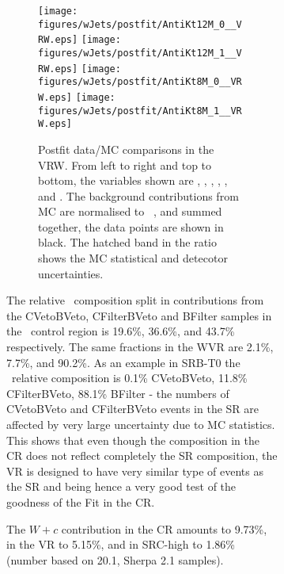 \begin{figure}[htbp]
\begin{center}
\begin{figure}[htbp]
\begin{center}
{{\begin{figure}[!htb]
  \centering
  \texttt{[image: figures/wJets/postfit/AntiKt12M\_0\_\_VRW.eps]}
  \texttt{[image: figures/wJets/postfit/AntiKt12M\_1\_\_VRW.eps]}
  \texttt{[image: figures/wJets/postfit/AntiKt8M\_0\_\_VRW.eps]}
  \texttt{[image: figures/wJets/postfit/AntiKt8M\_1\_\_VRW.eps]}
  \caption{Postfit data/MC comparisons in the VRW. From left to right and top to bottom, the variables shown are \met, \mtbmin, \mtbmax, \mantikttwelvezero, \mantikttwelveone, and \mantikteightzero. The background contributions from MC are normalised to \intlumi\ \ifb, and summed together, the data points are shown in black. The hatched band in the ratio shows the MC statistical and detecotor uncertainties.}
  \label{fig:VRWMasses}
\end{figure}


The relative \Wjets\ composition split in contributions from the CVetoBVeto, CFilterBVeto and BFilter samples in the \Wjets\ control region is 19.6\%, 36.6\%, and 43.7\% respectively. The same fractions in the WVR are 2.1\%, 7.7\%, and 90.2\%. As an example in SRB-T0 the \Wjets\ relative composition is 0.1\% CVetoBVeto, 11.8\% CFilterBVeto, 88.1\% BFilter - the numbers of CVetoBVeto and CFilterBVeto events in the SR are affected by very large uncertainty due to MC statistics. This shows that even though the composition in the CR does not reflect completely the SR composition, the VR is designed to have very similar type of events as the SR and being hence a very good test of the goodness of the Fit in the CR.

The $W+c$ contribution in the CR amounts to 9.73\%, in the VR to 5.15\%, and in SRC-high to 1.86\% (number based on 20.1, Sherpa 2.1 samples).

\begin{figure}[htpb]
  \begin{center}
    \\
    \\


\end{center}
\end{figure}}}
\end{center}
\end{figure}
\end{center}
\end{figure}
